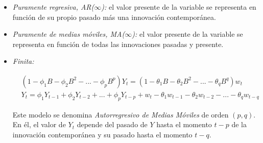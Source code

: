 \documentclass[a4paper,10pt]{article}
\begin{document}
\begin{itemize}
 \item \textit{Puramente regresiva, AR($\infty$):} el valor presente de la variable se representa en función de su propio pasado más una innovación contemporánea.

 \item \textit{Puramente de medias móviles, MA($\infty$):} el valor presente de la variable se representa en función de todas las innovaciones pasadas y presente.

 \item \textit{Finita:}

 \begin{equation}
 \begin{split}
 &(1-\phi_1B - \phi_2B^2 - ... - \phi_pB^p) Y_t = (1-\theta_1B - \theta_2B^2 - ... - \theta_qB^q) w_t \\
 &Y_t = \phi_1Y_{t-1} + \phi_2Y_{t-2} + ... + \phi_pY_{t-p} + w_t -\theta_1w_{t-1} - \theta_2w_{t-2} - ... - \theta_qw_{t-q}
 \end{split}
 \end{equation}

 Este modelo se denomina \textit{Autorregresivo de Medias Móviles} de orden $(p,q)$. En él, el valor de $Y_t$ depende del pasado de $Y$ hasta el momento $t-p$ de la innovación contemporánea y su pasado hasta el momento $t-q$.
\end{itemize}
\end{document}
